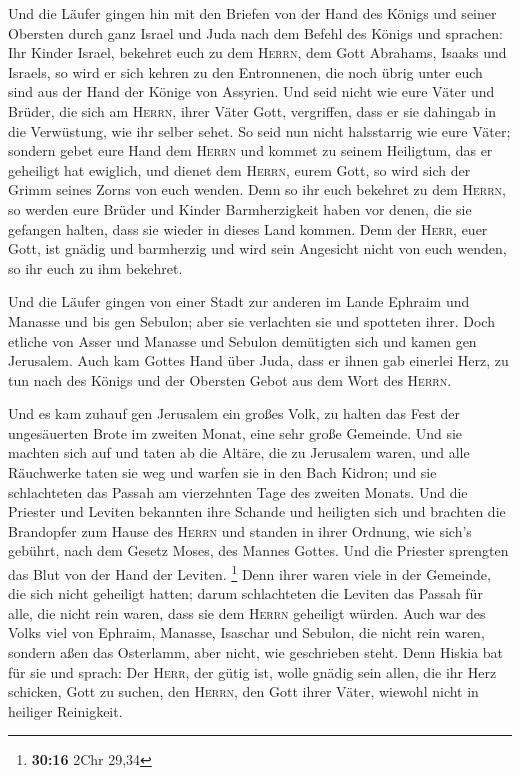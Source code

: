  Und die Läufer gingen hin mit den Briefen von der Hand
des Königs und seiner Obersten durch ganz Israel und Juda nach dem
Befehl des Königs und sprachen: Ihr Kinder Israel, bekehret euch zu dem
\textsc{Herrn}, dem Gott Abrahams, Isaaks und Israels, so wird er sich
kehren zu den Entronnenen, die noch übrig unter euch sind aus der Hand
der Könige von Assyrien.  Und seid nicht wie eure Väter
und Brüder, die sich am \textsc{Herrn}, ihrer Väter Gott, vergriffen,
dass er sie dahingab in die Verwüstung, wie ihr selber sehet.
 So seid nun nicht halsstarrig wie eure Väter; sondern
gebet eure Hand dem \textsc{Herrn} und kommet zu seinem Heiligtum, das
er geheiligt hat ewiglich, und dienet dem \textsc{Herrn}, eurem Gott, so
wird sich der Grimm seines Zorns von euch wenden.  Denn so
ihr euch bekehret zu dem \textsc{Herrn}, so werden eure Brüder und
Kinder Barmherzigkeit haben vor denen, die sie gefangen halten, dass sie
wieder in dieses Land kommen. Denn der \textsc{Herr}, euer Gott, ist
gnädig und barmherzig und wird sein Angesicht nicht von euch wenden, so
ihr euch zu ihm bekehret.

 Und die Läufer gingen von einer Stadt zur anderen im
Lande Ephraim und Manasse und bis gen Sebulon; aber sie verlachten sie
und spotteten ihrer.  Doch etliche von Asser und Manasse
und Sebulon demütigten sich und kamen gen Jerusalem. 
Auch kam Gottes Hand über Juda, dass er ihnen gab einerlei Herz, zu tun
nach des Königs und der Obersten Gebot aus dem Wort des \textsc{Herrn}.

 Und es kam zuhauf gen Jerusalem ein großes Volk, zu
halten das Fest der ungesäuerten Brote im zweiten Monat, eine sehr große
Gemeinde.  Und sie machten sich auf und taten ab die
Altäre, die zu Jerusalem waren, und alle Räuchwerke taten sie weg und
warfen sie in den Bach Kidron;  und sie schlachteten das
Passah am vierzehnten Tage des zweiten Monats. Und die Priester und
Leviten bekannten ihre Schande und heiligten sich und brachten die
Brandopfer zum Hause des \textsc{Herrn}  und standen in
ihrer Ordnung, wie sich's gebührt, nach dem Gesetz Moses, des Mannes
Gottes. Und die Priester sprengten das Blut von der Hand der Leviten.
\footnote{\textbf{30:16} 2Chr 29,34}  Denn ihrer waren
viele in der Gemeinde, die sich nicht geheiligt hatten; darum
schlachteten die Leviten das Passah für alle, die nicht rein waren, dass
sie dem \textsc{Herrn} geheiligt würden.  Auch war des
Volks viel von Ephraim, Manasse, Isaschar und Sebulon, die nicht rein
waren, sondern aßen das Osterlamm, aber nicht, wie geschrieben steht.
Denn Hiskia bat für sie und sprach: Der \textsc{Herr}, der gütig ist,
wolle gnädig sein  allen, die ihr Herz schicken, Gott zu
suchen, den \textsc{Herrn}, den Gott ihrer Väter, wiewohl nicht in
heiliger Reinigkeit.

